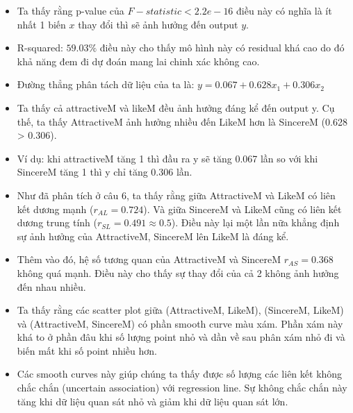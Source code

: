 \documentclass[a4paper,12pt]{article}
\begin{document}
	
	\begin{itemize}
		\item Ta thấy rằng p-value của $F-statistic < 2.2e-16$ điều này có nghĩa là ít nhất 1 biến $x$ thay đổi thì sẽ ảnh hưởng đến output $y$.
		\item R-squared: $59.03\%$ điều này cho thấy mô hình này có residual khá cao do đó khả năng đem đi dự đoán mang lai chinh xác không cao.
		\item Đường thẳng phân tách dữ liệu của ta là: $y = 0.067 + 0.628x_1 + 0.306x_2$
		\item Ta thấy cả attractiveM và likeM đều ảnh hưởng đáng kể đến output y. Cụ thế, ta thấy AttractiveM ảnh hưởng nhiều đến LikeM hơn là SincereM (0.628 > 0.306).
		\item Ví dụ: khi attractiveM tăng 1 thì đầu ra y sẽ tăng 0.067 lần so với khi SincereM tăng 1 thì y chỉ tăng 0.306 lần.
		\item Như đã phân tích ở câu 6, ta thấy rằng giữa AttractiveM và LikeM có liên kết dương mạnh ($r_{AL} = 0.724$). Và giữa SincereM và LikeM cũng có liên kết dương trung tính ($r_{SL} = 0.491 \approx 0.5$). Điều này lại một lần nữa khẳng định sự ảnh hưởng của AttractiveM, SincereM lên LikeM là đáng kể.
		\item Thêm vào đó, hệ số tương quan của AttractiveM và SincereM $r_{AS} = 0.368$ không quá mạnh. Điều này cho thấy sự thay đổi của cả 2 không ảnh hưởng đến nhau nhiều.
		\item Ta thấy rằng các scatter plot giữa (AttractiveM, LikeM), (SincereM, LikeM) và (AttractiveM, SincereM) có phần smooth curve màu xám. Phần xám này khá to ở phần đâu khi số lượng point nhỏ và dần về sau phân xám nhỏ đi và biến mất khi số point nhiều hơn.
		\item Các smooth curves này giúp chúng ta thấy được số lượng các liên kết không chắc chắn (uncertain association) với regression line. Sự không chắc chắn này tăng khi dữ liệu quan sát nhỏ và giảm khi dữ liệu quan sát lớn.
		
	\end{itemize}
	
\end{document}

